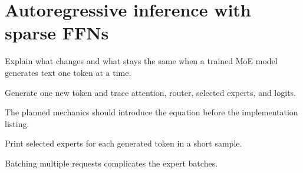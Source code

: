 \section{Autoregressive inference with sparse FFNs}
\label{sec:ch12-autoregressive-inference-with-sparse-ffns}

Explain what changes and what stays the same when a trained MoE model generates text one token at a time.



Generate one new token and trace attention, router, selected experts, and logits.



The planned mechanics should introduce the equation before the implementation listing.





\begin{checkpointbox}
Print selected experts for each generated token in a short sample.
\end{checkpointbox}

Batching multiple requests complicates the expert batches.
